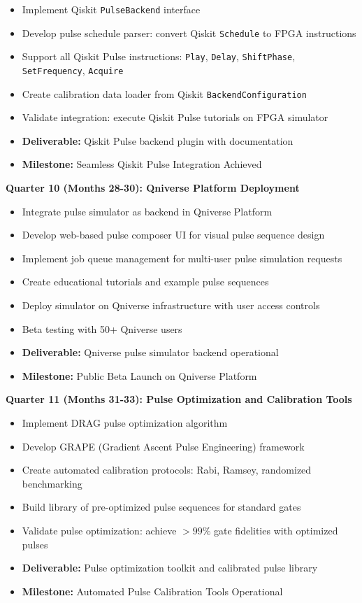 \documentclass[12pt,a4paper]{article}
\begin{document}
\begin{itemize}[noitemsep]
\item Implement Qiskit \texttt{PulseBackend} interface
\item Develop pulse schedule parser: convert Qiskit \texttt{Schedule} to FPGA instructions
\item Support all Qiskit Pulse instructions: \texttt{Play}, \texttt{Delay}, \texttt{ShiftPhase}, \texttt{SetFrequency}, \texttt{Acquire}
\item Create calibration data loader from Qiskit \texttt{BackendConfiguration}
\item Validate integration: execute Qiskit Pulse tutorials on FPGA simulator
\item \textbf{Deliverable:} Qiskit Pulse backend plugin with documentation
\item \textbf{Milestone:} Seamless Qiskit Pulse Integration Achieved
\end{itemize}

\textbf{Quarter 10 (Months 28-30): Qniverse Platform Deployment}

\begin{itemize}[noitemsep]
\item Integrate pulse simulator as backend in Qniverse Platform
\item Develop web-based pulse composer UI for visual pulse sequence design
\item Implement job queue management for multi-user pulse simulation requests
\item Create educational tutorials and example pulse sequences
\item Deploy simulator on Qniverse infrastructure with user access controls
\item Beta testing with 50+ Qniverse users
\item \textbf{Deliverable:} Qniverse pulse simulator backend operational
\item \textbf{Milestone:} Public Beta Launch on Qniverse Platform
\end{itemize}

\textbf{Quarter 11 (Months 31-33): Pulse Optimization and Calibration Tools}

\begin{itemize}[noitemsep]
\item Implement DRAG pulse optimization algorithm
\item Develop GRAPE (Gradient Ascent Pulse Engineering) framework
\item Create automated calibration protocols: Rabi, Ramsey, randomized benchmarking
\item Build library of pre-optimized pulse sequences for standard gates
\item Validate pulse optimization: achieve $>99\%$ gate fidelities with optimized pulses
\item \textbf{Deliverable:} Pulse optimization toolkit and calibrated pulse library
\item \textbf{Milestone:} Automated Pulse Calibration Tools Operational
\end{itemize}
\end{document}
